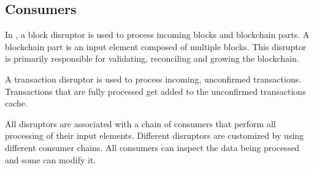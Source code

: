 \subsection{Consumers}
\label{sec:consumers}
In \codename, a block disruptor is used to process incoming blocks and blockchain parts.
A blockchain part is an input element composed of multiple blocks.
This disruptor is primarily responsible for validating, reconciling and growing the blockchain.

A transaction disruptor is used to process incoming, unconfirmed transactions.
Transactions that are fully processed get added to the unconfirmed transactions cache.

All disruptors are associated with a chain of consumers that perform all processing of their input elements.
Different disruptors are customized by using different consumer chains.
All consumers can inspect the data being processed and some can modify it.

